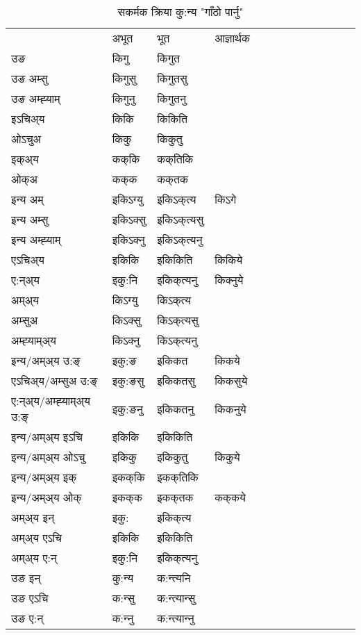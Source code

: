 \begin{table}[H]
\centering
\caption{\label{ik.vt} सकर्मक क्रिया  कु:न्य  "गाँठो पार्नु"  }
\begin{tabular}{l|l|l|l|l|l|l|l|l|l|l|l|l}  \toprule
&अभूत & भूत & आज्ञार्थक \\ 
उङ &किगु &किगुत \\ 
उङ अम्सु &किगुसु &किगुतसु \\ 
उङ अम्ह्‍याम् &किगुनु &किगुतनु \\ 
इऽचिअ्य &किकि &किकिति   \\ 
ओऽचुअ &किकु &किकुतु   \\ 
इक्अ्य &कक्‌कि &कक्‌तिकि   \\ 
ओक्अ &कक्‌क &कक्‌तक   \\ 
इन्य अम् & इकिऽग्यु  & इकिऽक्‌त्य &किऽगे  \\ 
इन्य अम्सु & इकिऽक्सु  & इकिऽक्‌त्यसु   \\ 
इन्य अम्ह्‍याम् & इकिऽक्‍नु  & इकिऽक्‌त्यनु   \\ 
एऽचिअ्य & इकिकि & इकिकिति &किकिये    \\ 
ए:न्अ्य & इकु:नि  & इकिक्‌त्यनु &किक्‍नुये  \\ 
अम्अ्य & किऽग्यु  & किऽक्‌त्य  \\ 
अम्सुअ & किऽक्सु & किऽक्‌त्यसु  \\ 
अम्ह्‍याम्अ्य & किऽक्‍नु  & किऽक्‌त्यनु \\ 
\midrule
इन्य/अम्अ्य उ:ङ्‌&इकु:ङ & इकिकत &किकये \\ 
एऽचिअ्य/अम्सुअ उ:ङ्‌ &इकु:ङसु & इकिकतसु &किकसुये \\ 
ए:न्अ्य/अम्ह्‍याम्अ्य उ:ङ्‌ &इकु:ङनु & इकिकतनु &किकनुये \\ 
इन्य/अम्अ्य इऽचि & इकिकि & इकिकिति    \\ 
इन्य/अम्अ्य ओऽचु & इकिकु & इकिकुतु  &किकुये  \\ 
इन्य/अम्अ्य इक् & इकक्‌कि & इकक्‌तिकि   \\ 
इन्य/अम्अ्य ओक् & इकक्‌क & इकक्‌तक  &कक्‌कये  \\ 
अम्अ्य इन् & इकु: & इकिक्‌त्य   \\ 
अम्अ्य एऽचि & इकिकि & इकिकिति    \\ 
अम्अ्य ए:न् & इकु:नि  & इकिक्‌त्यनु  \\ 
\midrule
उङ इन् & कु:न्य  & क:न्त्यनि  \\ 
उङ एऽचि & क:न्सु  & क:न्त्यान्सु   \\ 
उङ ए:न्& क:न्‍नु  & क:न्त्यान्‍नु   \\ 
\bottomrule
\end{tabular}
\end{table}


